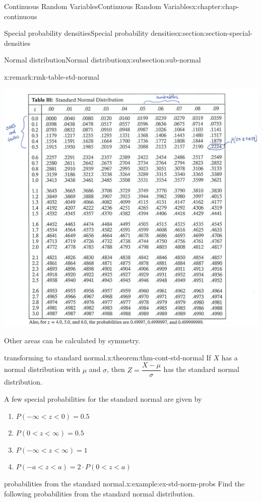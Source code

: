 \documentclass[oneside,10pt,]{book}
\newcommand{\lt}{<}
\begin{document}
\begin{chapterptx}{Continuous Random Variables}{}{Continuous Random Variables}{}{}{x:chapter:chap-continuous}
\begin{sectionptx}{Special probability densities}{}{Special probability densities}{}{}{x:section:section-special-densities}
\begin{subsectionptx}{Normal distribution}{}{Normal distribution}{}{}{x:subsection:sub-normal}
\begin{remark}{}{x:remark:rmk-table-std-normal}
\begin{figureptx}
\begin{image}{0.1}{0.8}{0.1}%
\includegraphics[width=\linewidth]{./images/ztab.png}
\end{image}%
\tcblower
\end{figureptx}%
Other areas can be calculated by symmetry.%
\end{remark}
\begin{theorem}{transforming to standard normal.}{}{x:theorem:thm-cont-std-normal}%
If \(X\) has a normal distribution with \(\mu\) and \(\sigma\), then \(\displaystyle Z = \dfrac{X - \mu}{\sigma}\) has the standard normal distribution.%
\end{theorem}
A few special probabilities for the standard normal are given by%
\begin{enumerate}
\item{}\(\displaystyle P(-\infty \lt z \lt 0) = 0.5\)%
\item{}\(\displaystyle P(0 \lt z \lt \infty) = 0.5\)%
\item{}\(\displaystyle P(-\infty \lt z \lt \infty) = 1\)%
\item{}\(\displaystyle P(-a \lt z \lt a) = 2\cdot P(0 \lt z \lt a)\)%
\end{enumerate}
%
\begin{example}{probabilities from the standard normal.}{x:example:ex-std-norm-probs}%
Find the following probabilities from the standard normal distribution.%
\begin{enumerate}

\end{enumerate}
\end{example}
\end{subsectionptx}
\end{sectionptx}
\end{chapterptx}
\end{document}
